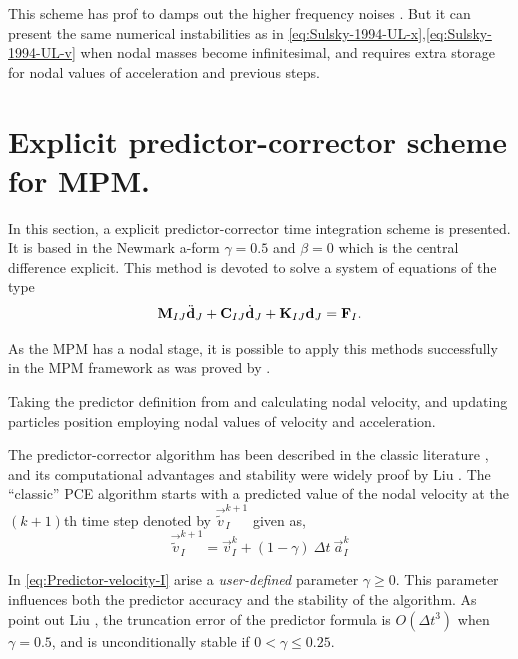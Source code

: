 This scheme has prof to damps out the higher frequency noises
\cite{Tran2019e}. But it can present the same numerical instabilities
as in \eqref{eq:Sulsky-1994-UL-x},\eqref{eq:Sulsky-1994-UL-v} when
nodal masses become infinitesimal, and requires extra storage for
nodal values of acceleration and previous steps.  

\section{Explicit predictor-corrector scheme for MPM.}
\label{sec:epc-algor-mpm}

In this section, a explicit predictor-corrector time integration
scheme is presented. It is based in the Newmark a-form 
$\gamma = 0.5$ and $\beta = 0$ which is the central difference
explicit. This method is devoted to solve a system of equations of the type
\begin{equation*}
  \mathbf{{M}}_{IJ}\ddot{\mathbf{{d}}}_{J} + \mathbf{{C}}_{IJ}\dot{\mathbf{{d}}}_{J} +
  \mathbf{{K}}_{IJ}\mathbf{{d}}_{J} = \mathbf{{F}}_{I}.
\end{equation*}

As the MPM has a nodal stage, it is possible to apply this methods
successfully in the MPM framework as was proved by
\cite{Tran2019e}.

Taking the predictor definition from and calculating nodal velocity, and updating
particles position employing nodal values of velocity and acceleration.

The predictor-corrector algorithm has been described in the classic literature
\cite{Hughes2000}, and its computational advantages and stability were widely
proof by Liu \cite{Xiaojian94}. The ``classic'' PCE algorithm starts
with a predicted value of the nodal velocity at the $(k+1)$th time step denoted by $\vec{\tilde{v}}_I^{k+1}$ given as,
\begin{equation}
  \label{eq:Predictor-velocity-I}
  \vec{\tilde{v}}_I^{k+1} = \vec{v}_I^k + (1 - \gamma)\ \Delta t\ \vec{a}_I^k
\end{equation}

In \eqref{eq:Predictor-velocity-I} arise a \textit{user-defined}
parameter $\gamma \geq 0$. This parameter influences both the predictor accuracy
and the stability of the algorithm. As point out Liu
\cite{Xiaojian94}, the truncation error of the predictor formula is
$O(\Delta t^3)$ when $\gamma = 0.5$, and is unconditionally stable if
$ 0 < \gamma \leq 0.25$. 

